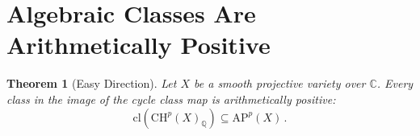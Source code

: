 \documentclass[aps,prd,twocolumn,superscriptaddress,nofootinbib]{revtex4-2}
\newtheorem{theorem}{Theorem}[section]
\theoremstyle{definition}
\theoremstyle{remark}
\begin{document}
\section{Algebraic Classes Are Arithmetically Positive}
\label{sec:easy_direction}

\begin{theorem}[Easy Direction]
\label{thm:easy_direction}
Let $X$ be a smooth projective variety over $\mathbb{C}$. Every class in the image of the cycle class map is arithmetically positive:
\begin{equation}
\mathrm{cl}\!\left(\mathrm{CH}^p(X)_\mathbb{Q}\right) \subseteq \mathrm{AP}^p(X)\,.
\end{equation}
\end{theorem}
\end{document}
